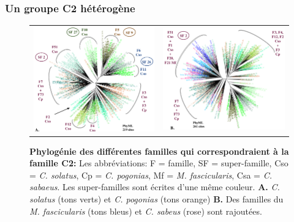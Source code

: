\documentclass[12pt,a4paper]{article}
\begin{document}
	\subsubsection{Un groupe C2 hétérogène}
			\begin{figure}
			\center	
			\begin{tabular}{cc}
 \includegraphics[scale=0.32]{img/tree_C2_pogonias_solatus.png}  & \includegraphics[scale=0.32]{img/tree_C2_all_species.png} \\
	\end{tabular}
	\caption{\textbf{Phylogénie des différentes familles qui correspondraient à la famille C2:}
	Les abbréviations: F = famille, SF = super-famille, Cso = \textit{C. solatus}, Cp = \textit{C. pogonias}, Mf = \textit{M. fascicularis}, Csa = \textit{C. sabaeus}. Les super-familles sont écrites d'une même couleur. \textbf{A.} \textit{C. solatus} (tons verts) et \textit{C. pogonias} (tons orange) \textbf{B.} Des familles du \textit{M. fascicularis} (tons bleus) et \textit{C. sabeus} (rose) sont rajoutées.	 
	\label{tree_C2}} 
\end{figure}
\end{document}
